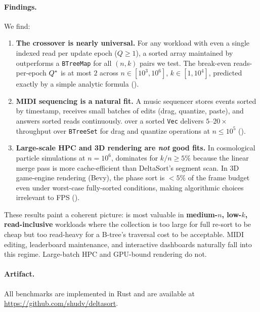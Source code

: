 \paragraph{Findings.} We find:

\begin{enumerate}
  \item \textbf{The crossover is nearly universal.}
    For any workload with even a single indexed read per update epoch
    ($Q \geq 1$), a sorted array maintained by \DeltaSort outperforms
    a \texttt{BTreeMap} for all $(n, k)$ pairs we test.
    The break-even reads-per-epoch $Q^*$ is at most $2$ across
    $n \in [10^3, 10^6]$, $k \in [1, 10^4]$, predicted exactly by a
    simple analytic formula ().

  \item \textbf{MIDI sequencing is a natural fit.}
    A music sequencer stores events sorted by timestamp, receives small
    batches of edits (drag, quantize, paste), and answers sorted reads
    continuously.
    \DeltaSort over a sorted \texttt{Vec} delivers
    $5$--$20\times$ throughput over \texttt{BTreeSet} for drag and
    quantize operations at $n \leq 10^5$ ().

  \item \textbf{Large-scale HPC and 3D rendering are \emph{not} good fits.}
    In cosmological particle simulations at $n = 10^6$, \ESM dominates
    \DeltaSort for $k/n \geq 5\%$ because the linear merge pass is
    more cache-efficient than DeltaSort's segment scan.
    In 3D game-engine rendering (Bevy), the phase sort is $<5\%$ of
    the frame budget even under worst-case fully-sorted conditions,
    making algorithmic choices irrelevant to FPS ().
\end{enumerate}

These results paint a coherent picture: \DeltaSort is most valuable in
\textbf{medium-$n$, low-$k$, read-inclusive} workloads where the collection
is too large for full re-sort to be cheap but too read-heavy for a B-tree's
traversal cost to be acceptable.
MIDI editing, leaderboard maintenance, and interactive dashboards naturally
fall into this regime.
Large-batch HPC and GPU-bound rendering do not.

\paragraph{Artifact.} All benchmarks are implemented in Rust and are
available at \url{https://github.com/shudv/deltasort}.
